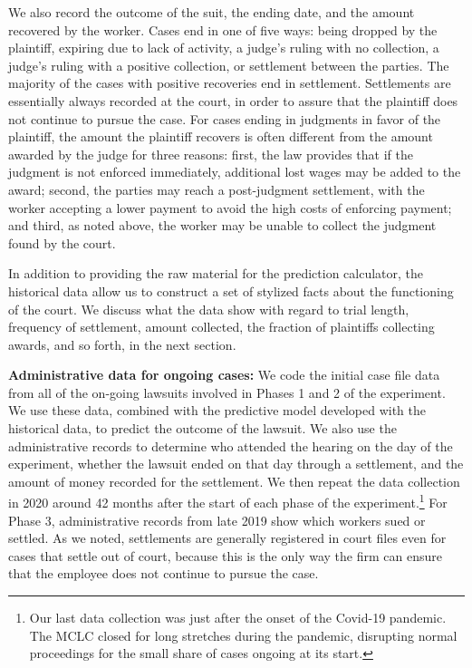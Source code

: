 \documentclass[11pt, a4paper]{article}
\begin{document}
We also record the outcome of the suit, the ending date, and the amount recovered by the worker. Cases end in one of five ways: being dropped by the plaintiff, expiring due to lack of activity, a judge's ruling with no collection, a judge's ruling with a positive collection, or settlement between the parties. The majority of the cases with positive recoveries end in settlement. Settlements are essentially always recorded at the court, in order to assure that the plaintiff does not continue to pursue the case. For cases ending in judgments in favor of the plaintiff, the  amount the plaintiff recovers is often different from the amount awarded by the judge for three reasons: first, the law provides that if the judgment is not enforced immediately, additional lost wages may be added to the award; second, the parties may reach a post-judgment settlement, with the worker accepting a lower payment to avoid the high costs of enforcing payment; and third, as noted above, the worker may be unable to collect the judgment found by the court. %

 In addition to providing the raw material for the prediction calculator, the historical data allow us to construct a set of stylized facts about the functioning of the court. We discuss what the data show with regard to trial length, frequency of settlement, amount collected, the fraction of plaintiffs collecting awards, and so forth, in the next section. 

\vspace{5mm}
\noindent\textbf{Administrative data for ongoing cases:}  We code the initial case file data from all of the on-going lawsuits involved in Phases 1 and 2 of the experiment. We use these data, combined with the predictive model developed with the historical data, to predict the outcome of the lawsuit. We also use the administrative records to determine who attended the hearing on the day of the experiment, whether the lawsuit ended on that day through a settlement, and the amount of money recorded for the settlement. We then repeat the data collection in 2020 around 42 months after the start of each phase of the experiment.\footnote{Our last data collection was just after the onset of the Covid-19 pandemic. The MCLC closed for long stretches during the pandemic, disrupting normal proceedings for the small share of cases ongoing at its start.} For Phase 3, administrative records from late 2019 show which workers sued or settled. As we noted, settlements are generally registered in court files even for cases that settle out of court, because this is the only way the firm can ensure that the employee does not continue to pursue the case.
\end{document}
